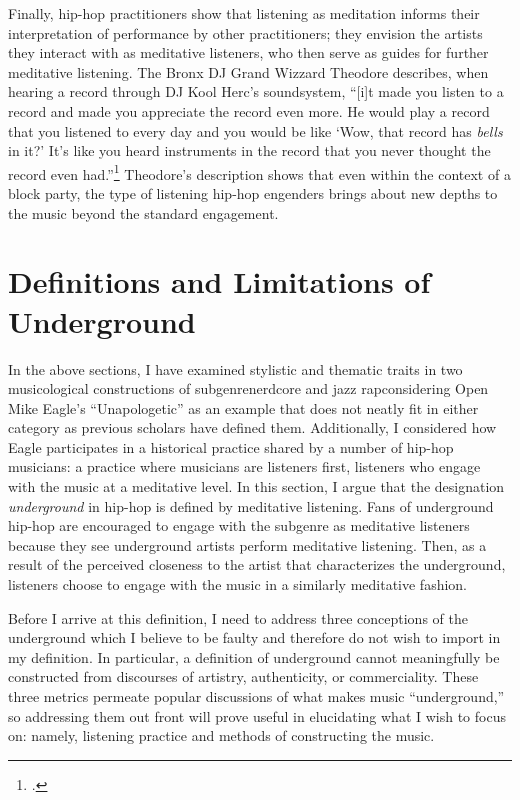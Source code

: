 Finally, hip-hop practitioners show that listening as meditation informs their interpretation of
performance by other practitioners; they envision the artists they interact with as meditative
listeners, who then serve as guides for further meditative listening. The Bronx DJ Grand Wizzard
Theodore describes, when hearing a record through DJ Kool Herc's soundsystem, ``[i]t made you
listen to a record and made you appreciate the record even more. He would play a record that 
you listened to every day and you would be like `Wow, that record has \emph{bells} in it?' It's 
like you heard instruments in the record that you never thought the record even had.''\footnote{
\autocite[139]{christabronGlassHiphopProduction2015}.} Theodore's description shows that even
within the context of a block party, the type of listening hip-hop engenders brings about new
depths to the music beyond the standard engagement.

\section{Definitions and Limitations of Underground}

In the above sections, I have examined stylistic and thematic traits in two musicological 
constructions of subgenre\textemdash nerdcore and jazz rap\textemdash considering Open Mike
Eagle's ``Unapologetic'' as an example that does not neatly fit in either category as previous
scholars have defined them. Additionally, I considered how Eagle participates in a historical
practice shared by a number of hip-hop musicians: a practice where musicians are listeners first,
listeners who engage with the music at a meditative level. In this section, I argue that the 
designation \emph{underground} in hip-hop is defined by meditative listening. Fans of underground
hip-hop are encouraged to engage with the subgenre as meditative listeners because they see 
underground artists perform meditative listening. Then, as a result of the perceived closeness to
the artist that characterizes the underground, listeners choose to engage with the music in a 
similarly meditative fashion.

Before I arrive at this definition, I need to address three conceptions of the underground which I
believe to be faulty and therefore do not wish to import in my definition. In particular, a definition
of underground cannot meaningfully be constructed from discourses of artistry, authenticity, or 
commerciality. These three metrics permeate popular discussions of what makes music ``underground,'' 
so addressing them out front will prove useful in elucidating what I wish to focus on: namely, 
listening practice and methods of constructing the music.

